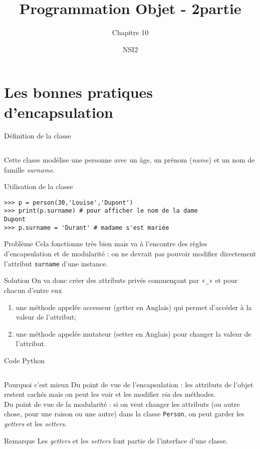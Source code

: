 \documentclass[10pt]{nsibeamer}
\title{Programmation Objet - 2\eme partie}
\subtitle{Chapitre 10}
\author{NSI2}
\begin{document}
\maketitle
\section{Les bonnes pratiques d'encapsulation}

\begin{frame}[fragile]{Définition de la classe}
	\inputminted{python}{scripts/classe1.py}
	Cette classe modélise une personne avec un âge, un prénom (\textit{name}) et un nom de famille \textit{surname}.
\end{frame}

\begin{frame}[fragile]{Utilisation de la classe}

\begin{verbatim}
>>> p = person(30,'Louise','Dupont')
>>> print(p.surname) # pour afficher le nom de la dame
Dupont
>>> p.surname = 'Durant' # madame s'est mariée
\end{verbatim}
\end{frame}
\begin{frame}{Problème}
	Cela fonctionne très bien mais va à l'encontre des règles d'encapsulation et de modularité : on ne devrait pas pouvoir modifier \alert{directement} l'attribut \texttt{surname} d'une instance.
\end{frame}
\begin{frame}{Solution}
On va donc créer des attributs privés commençant par «\texttt{\_}» et pour chacun d'entre eux 
\begin{enumerate}[--]
	\item 	une méthode appelée \alert{accesseur} (getter en Anglais) qui permet d'accéder à la valeur de l'attribut;
	\item 	une méthode appelée \alert{mutateur} (setter en Anglais) pour changer la valeur de l'attribut.
\end{enumerate}
\end{frame}
\begin{frame}[fragile]{Code Python}
\inputminted[fontsize=\scriptsize]{python}{scripts/classe2.py}
\end{frame}
\begin{frame}{Pourquoi c'est mieux}
Du point de vue de l'\alert{encapsulation} : les attributs de l'objet restent cachés mais on peut les voir et les modifier \textit{via} des méthodes.\\

Du point de vue de la \alert{modularité} : si on veut changer les attributs (ou autre chose, pour une raison ou une autre) dans la classe \texttt{Person}, on peut garder les \textit{getters} et les \textit{setters}.


\begin{block}{Remarque}
		Les \textit{getters} et les \textit{setters} font partie de l'interface d'une classe.
\end{block}	
\end{frame}
\end{document}

